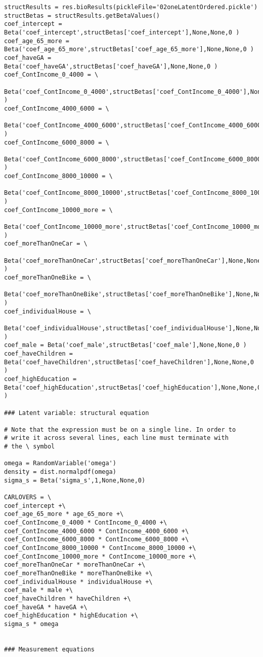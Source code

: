 \documentclass[12pt,a4paper]{article}
\begin{document}
\begin{lstlisting}[style=numbers]
structResults = res.bioResults(pickleFile='02oneLatentOrdered.pickle')
structBetas = structResults.getBetaValues()
coef_intercept = Beta('coef_intercept',structBetas['coef_intercept'],None,None,0 )
coef_age_65_more = Beta('coef_age_65_more',structBetas['coef_age_65_more'],None,None,0 )
coef_haveGA = Beta('coef_haveGA',structBetas['coef_haveGA'],None,None,0 )
coef_ContIncome_0_4000 = \
 Beta('coef_ContIncome_0_4000',structBetas['coef_ContIncome_0_4000'],None,None,0 )
coef_ContIncome_4000_6000 = \
 Beta('coef_ContIncome_4000_6000',structBetas['coef_ContIncome_4000_6000'],None,None,0 )
coef_ContIncome_6000_8000 = \
 Beta('coef_ContIncome_6000_8000',structBetas['coef_ContIncome_6000_8000'],None,None,0 )
coef_ContIncome_8000_10000 = \
 Beta('coef_ContIncome_8000_10000',structBetas['coef_ContIncome_8000_10000'],None,None,0 )
coef_ContIncome_10000_more = \
 Beta('coef_ContIncome_10000_more',structBetas['coef_ContIncome_10000_more'],None,None,0 )
coef_moreThanOneCar = \
 Beta('coef_moreThanOneCar',structBetas['coef_moreThanOneCar'],None,None,0 )
coef_moreThanOneBike = \
 Beta('coef_moreThanOneBike',structBetas['coef_moreThanOneBike'],None,None,0 )
coef_individualHouse = \
 Beta('coef_individualHouse',structBetas['coef_individualHouse'],None,None,0 )
coef_male = Beta('coef_male',structBetas['coef_male'],None,None,0 )
coef_haveChildren = Beta('coef_haveChildren',structBetas['coef_haveChildren'],None,None,0 )
coef_highEducation = Beta('coef_highEducation',structBetas['coef_highEducation'],None,None,0 )

### Latent variable: structural equation

# Note that the expression must be on a single line. In order to 
# write it across several lines, each line must terminate with 
# the \ symbol

omega = RandomVariable('omega')
density = dist.normalpdf(omega) 
sigma_s = Beta('sigma_s',1,None,None,0)

CARLOVERS = \
coef_intercept +\
coef_age_65_more * age_65_more +\
coef_ContIncome_0_4000 * ContIncome_0_4000 +\
coef_ContIncome_4000_6000 * ContIncome_4000_6000 +\
coef_ContIncome_6000_8000 * ContIncome_6000_8000 +\
coef_ContIncome_8000_10000 * ContIncome_8000_10000 +\
coef_ContIncome_10000_more * ContIncome_10000_more +\
coef_moreThanOneCar * moreThanOneCar +\
coef_moreThanOneBike * moreThanOneBike +\
coef_individualHouse * individualHouse +\
coef_male * male +\
coef_haveChildren * haveChildren +\
coef_haveGA * haveGA +\
coef_highEducation * highEducation +\
sigma_s * omega


### Measurement equations


\end{lstlisting}
\end{document}
